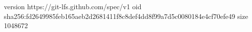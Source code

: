 version https://git-lfs.github.com/spec/v1
oid sha256:fd2649985feb165aeb2d2681411f8c8def4dd8f99a7d5c0080184e4cf70efe49
size 1048672
